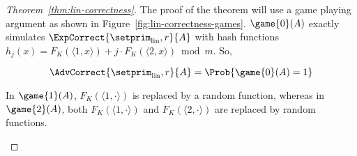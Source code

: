 \begin{proof}[Theorem~\ref{thm:lin-correctness}]
The proof of the theorem will use a game playing argument as shown in  Figure~\ref{fig:lin-correctness-games}. $\game{0}(A)$ exactly simulates $\ExpCorrect{\setprim_\mathrm{lin},r}{A}$ with hash functions $h_j(x) =  F_{K}(\langle 1,x \rangle) + j\cdot F_{K}(\langle 2,x \rangle) \bmod m$. So,

\begin{equation}
\AdvCorrect{\setprim_{\mathrm{lin}},r}{A} = \Prob{\game{0}(A)=1}\label{eq:0}
\end{equation}

 In $\game{1}(A)$, $F_{K}(\langle 1,\cdot \rangle)$ is replaced by a random function, whereas in $\game{2}(A)$, both $F_{K}(\langle 1,\cdot \rangle)$ and $F_{K}(\langle 2, \cdot \rangle)$ are replaced by random functions.

\begin{figure}[tp]
\end{figure}
\end{proof}
